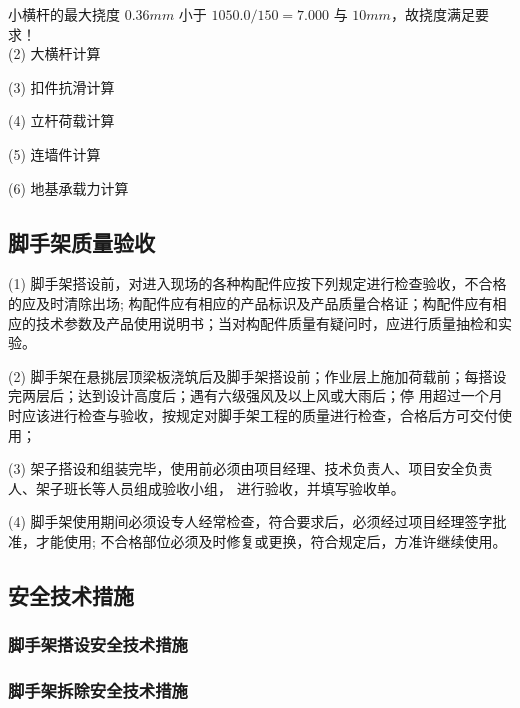 小横杆的最大挠度 $0.36mm$ 小于 $1050.0/150=7.000$ 与 $10mm$，故挠度满足要求！ \\

(2) 大横杆计算

(3) 扣件抗滑计算

(4) 立杆荷载计算

(5) 连墙件计算

(6) 地基承载力计算

\subsection{脚手架质量验收}

(1) 脚手架搭设前，对进入现场的各种构配件应按下列规定进行检查验收，不合格的应及时清除出场;
构配件应有相应的产品标识及产品质量合格证；构配件应有相应的技术参数及产品使用说明书；当对构配件质量有疑问时，应进行质量抽检和实
验。

(2) 脚手架在悬挑层顶梁板浇筑后及脚手架搭设前；作业层上施加荷载前；每搭设完两层后；达到设计高度后；遇有六级强风及以上风或大雨后；停
用超过一个月时应该进行检查与验收，按规定对脚手架工程的质量进行检查，合格后方可交付使用；

(3) 架子搭设和组装完毕，使用前必须由项目经理、技术负责人、项目安全负责人、架子班长等人员组成验收小组，
进行验收，并填写验收单。

(4) 脚手架使用期间必须设专人经常检查，符合要求后，必须经过项目经理签字批准，才能使用;
不合格部位必须及时修复或更换，符合规定后，方准许继续使用。 

\subsection{安全技术措施}
\subsubsection{脚手架搭设安全技术措施}

\subsubsection{脚手架拆除安全技术措施}
